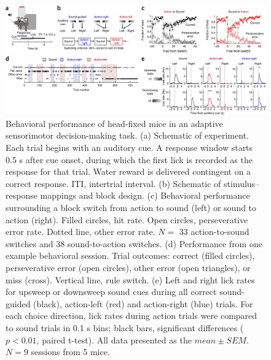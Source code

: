 \begin{figure}[htbp]

\begin{center}
\includegraphics[width=\textwidth]{Figures/Chapter3/NN_fig1} 
\end{center}

\caption[Behavioral performance of head-fixed mice in an adaptive sensorimotor decision-making task]
{Behavioral performance of head-fixed mice in an adaptive sensorimotor decision-making task.
(a) Schematic of experiment. Each trial begins with an auditory cue. A response window starts 0.5 s after cue onset, during which the first lick is recorded as the response for that trial. Water reward is delivered contingent on a correct response. ITI, intertrial interval. (b) Schematic of stimulus–response mappings and block design. (c) Behavioral performance surrounding a block switch from action to sound (left) or sound to action (right). Filled circles, hit rate. Open circles, perseverative error rate. Dotted line, other error rate. $N=$ 33 action-to-sound switches and 38 sound-to-action switches. (d) Performance from one example behavioral session. Trial outcomes: correct (filled circles), perseverative error (open circles), other error (open triangles), or miss (cross). Vertical line, rule switch. (e) Left and right lick rates for upsweep or downsweep sound cues during all correct sound-guided (black), action-left (red) and action-right (blue) trials. For each choice direction, lick rates during action trials were compared to sound trials in 0.1 s bins; black bars, significant differences ($p<0.01$, paired t-test). All data presented as the $\mathit{mean}\pm\mathit{SEM}$. $N = 9$ sessions from 5 mice.}

\label{fig:NN_fig1}
\end{figure}


